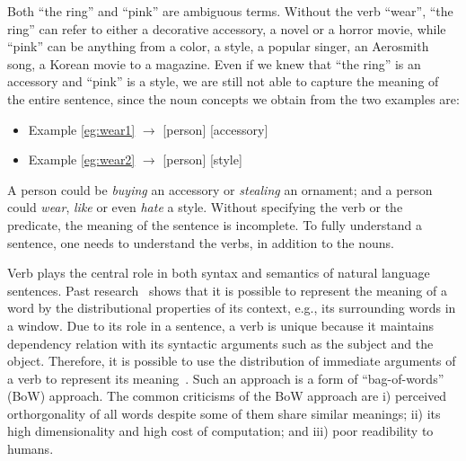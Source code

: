 {%
%
Both ``the ring'' and ``pink'' are ambiguous terms.
Without the verb ``wear'', ``the ring'' can refer to either
a decorative accessory, a novel or a horror movie,
while ``pink'' can be anything from
a color, a style, a popular singer, an Aerosmith song,
a Korean movie to a magazine.
%
%
Even if we knew that ``the ring'' is an accessory and
``pink'' is a style, we are still not able to capture the meaning
of the entire sentence, since the noun concepts we obtain from the
two examples are:
\begin{itemize}
\item Example \ref{eg:wear1} $\longrightarrow$ [person] [accessory]
\item Example \ref{eg:wear2} $\longrightarrow$ [person] [style]
\end{itemize}
A person could be {\em buying} an accessory or {\em stealing}
an ornament; and a person could {\em wear}, {\em like} or
even {\em hate} a style. Without specifying the verb
or the predicate, the meaning of the sentence is incomplete.
To fully understand a sentence, one needs to understand the verbs,
in addition to the nouns.
} %

Verb plays the central role in both syntax and semantics of natural
language sentences. Past research~\cite{mikolov2013efficient,mikolov2013distributed,mikolov2013linguistic} shows that it is
possible to represent the meaning of a word by the distributional
properties of its context, e.g., its surrounding words in a window.
Due to its role in
a sentence, a verb is unique because it maintains dependency relation
with its syntactic arguments such as the subject and the object.
Therefore, it is possible to use the
distribution of immediate arguments of a verb
to represent its meaning~\cite{Levy-acl14}. Such an approach is a form of
``bag-of-words'' (BoW) approach. The common criticisms of the BoW approach
are i) perceived orthorgonality of all words despite some of them share similar
meanings; ii) its high dimensionality and high cost of computation; and
iii) poor readibility to humans.

